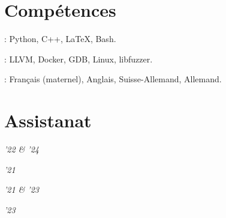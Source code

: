 \documentclass[mm, 11pt]{simple_style}
\begin{document}
\begin{resume}
\section{Compétences}
: Python, C++, \LaTeX, Bash.

: LLVM, Docker, GDB, Linux, libfuzzer.

: Français (maternel), Anglais, Suisse-Allemand, Allemand.

\sectionline
\section{Assistanat}
%

 \hfill\textit{ '22 \& '24}

 \hfill \textit{'21}

 \hfill \textit{'21 \& '23}

 \hfill \textit{'23}

\sectionline
%
%


\end{resume}
\end{document}
